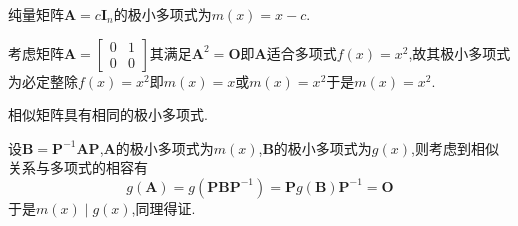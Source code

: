 \begin{brown}
\begin{example}
    纯量矩阵$\bm{A}=c\bm{I}_n$的极小多项式为$m\left(x\right)=x-c$.
\end{example}
\end{brown}
\begin{brown}
\begin{example}
    考虑矩阵$\bm{A}=\begin{bmatrix}
        0&1\\0&0
    \end{bmatrix}$其满足$\bm{A}^2=\bm{O}$即$\bm{A}$适合多项式$f\left(x\right)=x^2$,故其极小多项式为必定整除$f\left(x\right)=x^2$即$m\left(x\right)=x$或$m\left(x\right)=x^2$于是$m\left(x\right)=x^2.$
\end{example}
\end{brown}
\begin{formal}
\begin{proposition}[相似矩阵的极小多项式]\label{prop:相似矩阵的极小多项式}
    相似矩阵具有相同的极小多项式.
\end{proposition}
\begin{Proof}
设$\bm{B}=\bm{P}^{-1}\bm{AP}$,$\bm{A}$的极小多项式为$m\left(x\right)$,$\bm{B}$的极小多项式为$g\left(x\right)$,则考虑到相似关系与多项式的相容有
\[
g\left(\bm{A}\right)=g\left(\bm{P}\bm{BP}^{-1}\right)=\bm{P}g\left(\bm{B}\right)\bm{P}^{-1}=\bm{O}
\]于是$m\left(x\right)\mid g\left(x\right)$,同理得证.
\end{Proof}
\end{formal}
